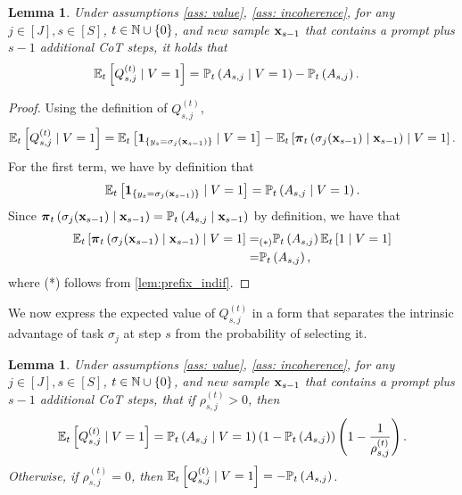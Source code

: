 \documentclass{article}
\theoremstyle{plain}
\newtheorem{lemma}[theorem]{Lemma}
\theoremstyle{definition}
\theoremstyle{remark}
\begin{document}
\begin{lemma}\label{lem:q_value_raw}
    Under assumptions \ref{ass: value}, \ref{ass: incoherence}, for any $j\in[J], s\in[S]$, $t \in \mathbb{N} \cup \{0\}$, and new sample $\mathbf{x}_{s-1}$ that contains a prompt plus $s-1$ additional CoT steps, it holds that
    \begin{align*}
        \mathbb{E}_t\left[Q^{(t)}_{s, j} \mid V=1\right] = &~ \mathbb{P}_t \left(A_{s,j}\mid V=1\right) - \mathbb{P}_t \left(A_{s,j}\right).
    \end{align*}  
\end{lemma}

\begin{proof}
Using the definition of $Q^{(t)}_{s, j}$, 
\begin{align*}
    \mathbb{E}_t\left[Q^{(t)}_{s, j} \mid V=1\right] = \mathbb{E}_t\left[\boldsymbol{1}_{\{y_{s} = \sigma_j(\mathbf{x}_{s-1})\}} \mid V=1\right] 
    - \mathbb{E}_t\left[\boldsymbol{\pi}_t\left(\sigma_j(\mathbf{x}_{s-1}) \mid \mathbf{x}_{s-1}\right) \mid V=1 \right].
\end{align*}
For the first term, we have by definition that  
\begin{align*}
    \mathbb{E}_t\left[\boldsymbol{1}_{\{y_{s} = \sigma_j(\mathbf{x}_{s-1})\}} \mid V=1\right] = \mathbb{P}_t \left(A_{s,j}\mid V=1\right).
\end{align*}
Since $\boldsymbol{\pi}_t\left(\sigma_j(\mathbf{x}_{s-1}) \mid \mathbf{x}_{s-1}\right)=\mathbb{P}_t\left(A_{s,j} \mid \mathbf{x}_{s-1}\right)$ by definition, we have that 
\begin{align*}
    \mathbb{E}_t\left[\boldsymbol{\pi}_t\left(\sigma_j(\mathbf{x}_{s-1}) \mid \mathbf{x}_{s-1}\right) \mid V=1 \right] 
    =&_{(*)} \mathbb{P}_t\left(A_{s,j}\right) \mathbb{E}_t\left[1 \mid V=1 \right] \\
    = & \mathbb{P}_t\left(A_{s,j}\right),
\end{align*}
where (*) follows from \cref{lem:prefix_indif}. 
\end{proof}

We now express the expected value of $Q^{(t)}_{s,j}$ in a form that separates the intrinsic advantage of task $\sigma_j$ at step $s$ from the probability of selecting it.

\begin{lemma}\label{lem:q_value}
Under assumptions \ref{ass: value}, \ref{ass: incoherence}, for any $j\in[J], s\in[S]$, $t \in \mathbb{N} \cup \{0\}$, and new sample $\mathbf{x}_{s-1}$ that contains a prompt plus $s-1$ additional CoT steps, that if $\rho_{s, j}^{(t)} > 0$, then
 \begin{align*}
        \mathbb{E}_t\left[Q^{(t)}_{s, j} \mid V=1\right] 
        = \mathbb{P}_t\left(A_{s,j} \mid V=1\right)\left(1 - \mathbb{P}_t\left(A_{s,j}\right)\right)\left(1 - \frac{1}{\rho_{s, j}^{(t)}}\right). 
    \end{align*}
Otherwise, if $\rho_{s, j}^{(t)} = 0$, then $\mathbb{E}_t\left[Q^{(t)}_{s, j} \mid V=1\right] = -\mathbb{P}_t\left(A_{s,j}\right)$.
\end{lemma}
\end{document}
